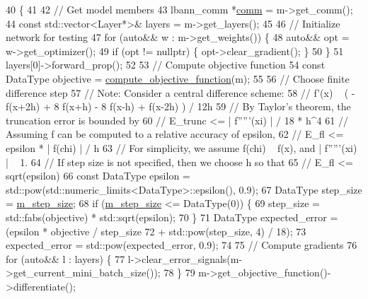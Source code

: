 \begin{DoxyCode}
40                                                           \{
41 
42   \textcolor{comment}{// Get model members}
43   lbann\_comm *\hyperlink{file__io_8cpp_ab048c6f9fcbcfaa57ce68b00263dbebe}{comm} = m->get\_comm();
44   \textcolor{keyword}{const} std::vector<Layer*>& layers = m->get\_layers();
45 
46   \textcolor{comment}{// Initialize network for testing}
47   \textcolor{keywordflow}{for} (\textcolor{keyword}{auto}&& w : m->get\_weights()) \{
48     \textcolor{keyword}{auto}&& opt = w->get\_optimizer();
49     \textcolor{keywordflow}{if} (opt != \textcolor{keyword}{nullptr}) \{ opt->clear\_gradient(); \}
50   \}
51   layers[0]->forward\_prop();
52 
53   \textcolor{comment}{// Compute objective function}
54   \textcolor{keyword}{const} DataType objective = \hyperlink{classlbann_1_1lbann__callback__gradient__check_a54ba40dd3b381d5c889d77edeffa37f9}{compute\_objective\_function}(m);
55 
56   \textcolor{comment}{// Choose finite difference step}
57   \textcolor{comment}{// Note: Consider a central difference scheme:}
58   \textcolor{comment}{//   f'(x) ~ ( - f(x+2h) + 8 f(x+h) - 8 f(x-h) + f(x-2h) ) / 12h}
59   \textcolor{comment}{// By Taylor's theorem, the truncation error is bounded by}
60   \textcolor{comment}{//   E\_trunc <= | f'''''(xi) | / 18 * h^4}
61   \textcolor{comment}{// Assuming f can be computed to a relative accuracy of epsilon,}
62   \textcolor{comment}{//   E\_fl <= epsilon * | f(chi) | / h}
63   \textcolor{comment}{// For simplicity, we assume f(chi) ~ f(x), and | f'''''(xi) | ~ 1.}
64   \textcolor{comment}{// If step size is not specified, then we choose h so that}
65   \textcolor{comment}{//   E\_fl <= sqrt(epsilon)}
66   \textcolor{keyword}{const} DataType epsilon = std::pow(std::numeric\_limits<DataType>::epsilon(), 0.9);
67   DataType step\_size = \hyperlink{classlbann_1_1lbann__callback__gradient__check_ab324dbfc7d21b69f135d33ee8290c4b2}{m\_step\_size};
68   \textcolor{keywordflow}{if} (\hyperlink{classlbann_1_1lbann__callback__gradient__check_ab324dbfc7d21b69f135d33ee8290c4b2}{m\_step\_size} <= DataType(0)) \{
69     step\_size = std::fabs(objective) * std::sqrt(epsilon);
70   \}
71   DataType expected\_error = (epsilon * objective / step\_size
72                              + std::pow(step\_size, 4) / 18);
73   expected\_error = std::pow(expected\_error, 0.9);
74 
75   \textcolor{comment}{// Compute gradients}
76   \textcolor{keywordflow}{for} (\textcolor{keyword}{auto}&& l : layers) \{
77     l->clear\_error\_signals(m->get\_current\_mini\_batch\_size());
78   \}
79   m->get\_objective\_function()->differentiate();

\end{DoxyCode}
